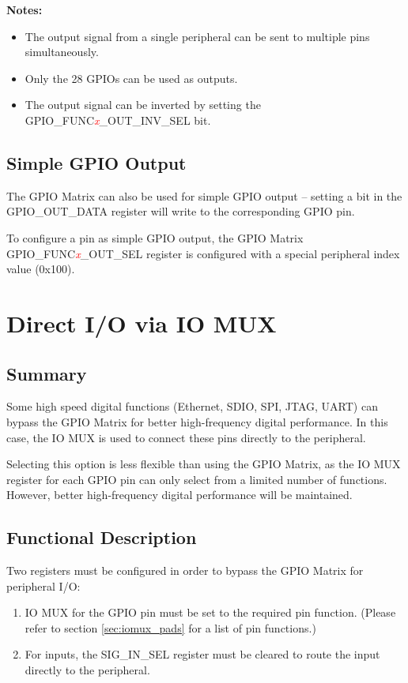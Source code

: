 \documentclass[main\_\_EN.tex]{subfiles}
\begin{document}
{\bfseries Notes:}
\begin{itemize}
\item The output signal from a single peripheral can be sent to multiple pins simultaneously.
\item Only the 28 GPIOs can be used as outputs.
\item The output signal can be inverted by setting the GPIO\_FUNC\textcolor{red}{\it{x}}\_OUT\_INV\_SEL bit.
\end{itemize}

\subsection{Simple GPIO Output}

The GPIO Matrix can also be used for simple GPIO output – setting a bit in the GPIO\_OUT\_DATA register will write to the corresponding GPIO pin.

To configure a pin as simple GPIO output, the GPIO Matrix GPIO\_FUNC\textcolor{red}{\it{x}}\_OUT\_SEL register is configured with a special peripheral index value (0x100).

\section{Direct I/O via IO MUX}

\subsection{Summary}

Some high speed digital functions (Ethernet, SDIO, SPI, JTAG, UART) can bypass the GPIO Matrix for better high-frequency digital performance. In this case, the IO MUX is used to connect these pins directly to the peripheral.

Selecting this option is less flexible than using the GPIO Matrix, as the IO MUX register for each GPIO pin can only select from a limited number of functions. However, better high-frequency digital performance will be maintained.

\subsection{Functional Description}\label{direct io via iomux}

Two registers must be configured in order to bypass the GPIO Matrix for peripheral I/O:

\begin{enumerate}
\item IO MUX for the GPIO pin must be set to the required pin function. (Please refer to section \ref{sec:iomux_pads} for a list of pin functions.)
\item For inputs, the SIG\_IN\_SEL register must be cleared to route the input directly to the peripheral.
\end{enumerate}
\end{document}
